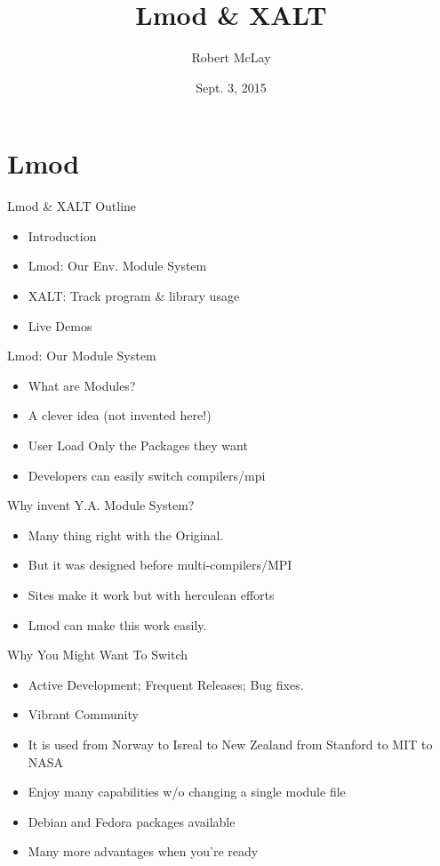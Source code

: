 \documentclass{beamer}
\title{Lmod \& XALT}
\author{Robert McLay}
\institute{The Texas Advanced Computing Center}
\date{Sept. 3, 2015}  %
\begin{document}
\begin{frame}
  \titlepage
\end{frame}

\section{Lmod}

\begin{frame}{Lmod \& XALT Outline}
  \begin{itemize}
    \item Introduction
    \item Lmod: Our Env. Module System
    \item XALT: Track program \& library usage
    \item Live Demos
  \end{itemize}
\end{frame}

\begin{frame}{Lmod: Our Module System}
  \begin{itemize}
    \item What are Modules?
    \item A clever idea (not invented here!)
    \item User Load Only the Packages they want
    \item Developers can easily switch compilers/mpi
  \end{itemize}
\end{frame}


\begin{frame}{Why invent Y.A. Module System?}
  \begin{itemize}
    \item Many thing right with the Original.
    \item But it was designed before multi-compilers/MPI
    \item Sites make it work but with herculean efforts
    \item Lmod can make this work easily.
  \end{itemize}
\end{frame}


\begin{frame}{Why You Might Want To Switch}
  \begin{itemize}
    \item Active Development;  Frequent Releases; Bug fixes.
    \item Vibrant Community
    \item It is used from Norway to Isreal to New Zealand from Stanford to MIT to NASA
    \item Enjoy many capabilities w/o changing a single module file
    \item Debian and Fedora packages available
    \item Many more advantages when you're ready
  \end{itemize}
\end{frame}
\end{document}
